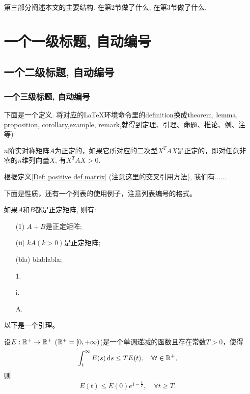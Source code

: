 \documentclass[UTF8,oneside,12pt]{article}  %
\theoremstyle{DingLi1}
\numberwithin{equation}{section}
\newtheorem{definition}{\hskip 2em 定义}[section]
\newtheorem{lemma}{\hskip 2em 引理}[section]
\newtheorem{property}{\hskip 2em 性质}[section]
\theoremstyle{DingLi2}
\def\d{\mathop{}\!\mathrm{d}} %
\begin{document}
第三部分阐述本文的主要结构. 在第2节做了什么, 在第3节做了什么.





\section{一个一级标题, 自动编号}

\subsection{一个二级标题, 自动编号}

\subsubsection{一个三级标题, 自动编号}


下面是一个定义. 将对应的\LaTeX{}环境命令里的definition换成theorem, lemma, proposition, corollary,example, remark,就得到定理、引理、命题、推论、例、注等)
\begin{definition}\label{Def: positive def matrix}
$n$阶实对称矩阵$A$为正定的，如果它所对应的二次型$X^T A X$是正定的，即对任意非零的$n$维列向量$X$, 有$X^T A X>0$.
\end{definition}



根据定义\ref{Def: positive def matrix} (注意这里的交叉引用方法), 我们有......

下面是性质，还有一个列表的使用例子，注意列表编号的格式。
\begin{property}\label{Property: positive matrix}
如果$A$和$B$都是正定矩阵, 则有:
\begin{itemize}
  \item[(1)]$A+B$是正定矩阵;
  \item[(ii)]$kA$$(k>0)$是正定矩阵;
  \item[(bla)]blablabla;
  \item[1.]
  \item[i.]
  \item[A.]
\end{itemize}
\end{property}

以下是一个引理。
\begin{lemma}
设$E:\Bbb{R}^+ \to \Bbb{R}^+$ ($\Bbb{R}^+=[0,+\infty)$)是一个单调递减的函数且存在常数$T>0$，使得
$$\int_t^{\infty} E(s) \d s \leq TE(t),\quad \forall t\in \Bbb{R}^+,$$
则
$$E(t)\leq E(0) e^{1- \frac{t}{T}},\quad \forall t\geq T. $$
\end{lemma}
\end{document}
